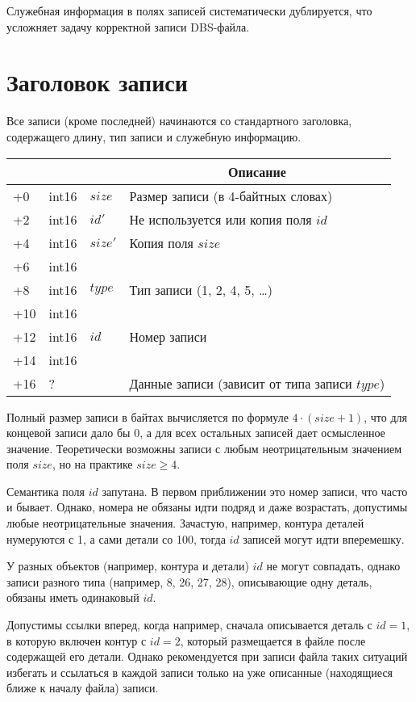 Служебная информация в полях записей систематически дублируется,
что усложняет задачу корректной записи DBS-файла.

\section*{Заголовок записи}

Все записи
(кроме последней)
начинаются со стандартного заголовка,
содержащего длину, тип записи
и служебную информацию.

\newcommand{\dbsRecord}[1]{
  \noindent
  \begin{tabularx}{\textwidth}{|>{\raggedleft}p{3em}|>{\centering}p{4em}|>{\centering}p{3em}|X|}
    \hline
    \multicolumn{1}{|c|}{Смещение} &
    \multicolumn{1}{c|}{Тип}      &
    \multicolumn{1}{c|}{Имя}      &
    \multicolumn{1}{c|}{Описание}     \\
    \hline
    #1
    \hline
  \end{tabularx}
}

\dbsRecord{
  +0  & int16 & $size$ & Размер записи (в 4-байтных словах) \\
  +2  & int16 & $id'$ & Не используется или копия поля $id$ \\
  +4  & int16 & $size'$ & Копия поля $size$ \\
  +6  & int16 &  &  \\
  +8  & int16 & $type$ & Тип записи (1, 2, 4, 5, \dots) \\
  +10 & int16 &  &  \\
  +12 & int16 & $id$ & Номер записи \\
  +14 & int16 &  &  \\
  +16 & ?     &  & Данные записи (зависит от типа записи $type$)  \\
}

Полный размер записи в байтах вычисляется по формуле
$4 \cdot (size+1)$,
что для концевой записи дало бы 0,
а для всех остальных записей дает осмысленное значение.
Теоретически возможны записи с любым неотрицательным значением поля
$size$,
но на практике
$size \geqslant 4$.

Семантика поля $id$ запутана.
В первом приближении это номер записи, что часто и бывает.
Однако, номера не обязаны идти подряд и даже возрастать,
допустимы любые неотрицательные значения.
Зачастую, например, контура деталей нумеруются с 1,
а сами детали со 100,
тогда $id$ записей могут идти вперемешку.

У разных объектов
(например, контура и детали)
$id$
не могут совпадать,
однако записи разного типа
(например, 8, 26, 27, 28),
описывающие одну деталь,
обязаны иметь одинаковый
$id$.

Допустимы ссылки вперед,
когда например, сначала описывается деталь с
$id=1$,
в которую включен контур с
$id=2$,
который размещается в файле после содержащей его детали.
Однако рекомендуется при записи файла таких ситуаций избегать
и ссылаться в каждой записи только на уже описанные
(находящиеся ближе к началу файла)
записи.

